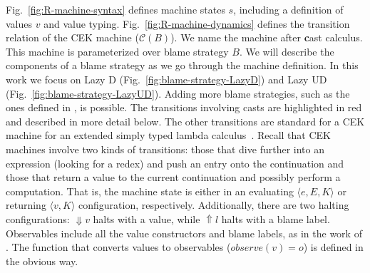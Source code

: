 \documentclass[runningheads]{llncs}
\newcommand{\CMachine}[1]{\ensuremath{\mathcal{C}(#1)}}
\newcommand{\error}[1]{\ensuremath{\Uparrow#1}}
\newcommand{\sexpr}[3]{\ensuremath{\langle#1,#2,#3\rangle}}
\newcommand{\scont}[2]{\ensuremath{\langle#1,#2\rangle}}
\newcommand{\shalt}[1]{\ensuremath{\Downarrow #1}}
\begin{document}
Fig.~\ref{fig:R-machine-syntax} defines machine 
states $s$, including a definition of values $v$ and value typing.
Fig.~\ref{fig:R-machine-dynamics} defines the transition relation of the CEK
machine (\CMachine{B}).
We name the machine after \textbf{c}ast calculus.
%
This machine is parameterized over blame strategy $B$. We will describe
the components of a blame strategy as we go through the machine definition.
In this work we focus on Lazy D (Fig.~\ref{fig:blame-strategy-LazyD}) and Lazy UD 
(Fig.~\ref{fig:blame-strategy-LazyUD}). Adding more blame strategies, 
such as the ones defined in \cite{siek2009exploring}, is possible.
%
The transitions involving casts are highlighted in red and described in
more detail below. The other transitions are standard for a CEK
machine for an extended simply typed lambda calculus~\citep{Felleisen:2009aa}.
%
Recall that CEK machines involve two kinds of transitions: those that
dive further into an expression (looking for a redex) and push an
entry onto the continuation and those that return a value to the
current continuation and possibly perform a computation.  That is, the
machine state is either in an evaluating $\sexpr{e}{E}{K}$ or
returning $\scont{v}{K}$ configuration, respectively. Additionally,
there are two halting configurations: \shalt{v} halts with a value,
while \error{l} halts with a blame label.  Observables include all the
value constructors and blame labels, as in the work of
\citet{siek2012interpretations}.  The function that converts values to
observables ($observe(v) = o$) is defined in the obvious way.
\end{document}

